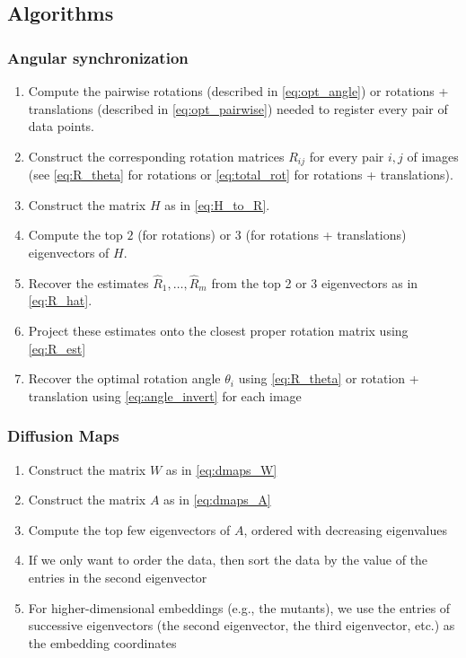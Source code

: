 \documentclass[12pt]{article}
\begin{document}
\subsection{Algorithms}

\subsubsection{Angular synchronization}

\begin{enumerate}
\item Compute the pairwise rotations (described in \eqref{eq:opt_angle}) or rotations + translations (described in \eqref{eq:opt_pairwise}) needed to register every pair of data points.
\item Construct the corresponding rotation matrices $R_{ij}$ for every pair $i, j$ of images (see \eqref{eq:R_theta} for rotations or \eqref{eq:total_rot} for rotations + translations).
\item Construct the matrix $H$ as in \eqref{eq:H_to_R}.
\item Compute the top $2$ (for rotations) or $3$ (for rotations + translations) eigenvectors of $H$.
\item Recover the estimates $\hat{R}_1, \dots, \hat{R}_m$ from the top 2 or 3 eigenvectors as in \eqref{eq:R_hat}.
\item Project these estimates onto the closest proper rotation matrix using \eqref{eq:R_est}
\item Recover the optimal rotation angle $\theta_i$ using \eqref{eq:R_theta} or rotation + translation using \eqref{eq:angle_invert} for each image
\end{enumerate}

\subsubsection{Diffusion Maps}

\begin{enumerate}
\item Construct the matrix $W$ as in \eqref{eq:dmaps_W}
\item Construct the matrix $A$ as in \eqref{eq:dmaps_A}
\item Compute the top few eigenvectors of $A$, ordered with decreasing eigenvalues
\item If we only want to order the data, then sort the data by the value of the entries in the second eigenvector
\item For higher-dimensional embeddings (e.g., the mutants), we use the entries of successive eigenvectors (the second eigenvector, the third eigenvector, etc.) as the embedding coordinates
\end{enumerate}
\end{document}
